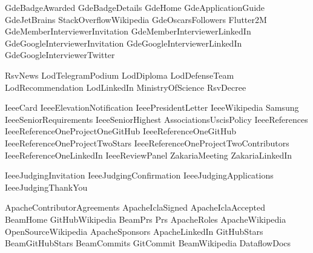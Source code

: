 \renewcommand\ExhibitGroup{Other}

{GdeBadgeAwarded}
{GdeBadgeDetails}
{GdeHome}
{GdeApplicationGuide}
{GdeJetBrains}
{StackOverflowWikipedia}
{GdeOscarsFollowers}
{Flutter2M}
{GdeMemberInterviewerInvitation}
{GdeMemberInterviewerLinkedIn}
{GdeGoogleInterviewerInvitation}
{GdeGoogleInterviewerLinkedIn}
{GdeGoogleInterviewerTwitter}

{RsvNews}
{LodTelegramPodium}
{LodDiploma}
{LodDefenseTeam}
{LodRecommendation}
{LodLinkedIn}
{MinistryOfScience}
{RsvDecree}

{IeeeCard}
{IeeeElevationNotification}
{IeeePresidentLetter}
{IeeeWikipedia}
{Samsung}
{IeeeSeniorRequirements}
{IeeeSeniorHighest}
{AssociationsUscisPolicy}
{IeeeReferences}
{IeeeReferenceOneProjectOneGitHub}
{IeeeReferenceOneGitHub}
{IeeeReferenceOneProjectTwoStars}
{IeeeReferenceOneProjectTwoContributors}
{IeeeReferenceOneLinkedIn}
{IeeeReviewPanel}
{ZakariaMeeting}
{ZakariaLinkedIn}

{IeeeJudgingInvitation}
{IeeeJudgingConfirmation}
{IeeeJudgingApplications}
{IeeeJudgingThankYou}

{ApacheContributorAgreements}
{ApacheIclaSigned}
{ApacheIclaAccepted}
{BeamHome}
{GitHubWikipedia}
{BeamPrs}
{Prs}
{ApacheRoles}
{ApacheWikipedia}
{OpenSourceWikipedia}
{ApacheSponsors}
{ApacheLinkedIn}
{GitHubStars}
{BeamGitHubStars}
{BeamCommits}
{GitCommit}
{BeamWikipedia}
{DataflowDocs}

